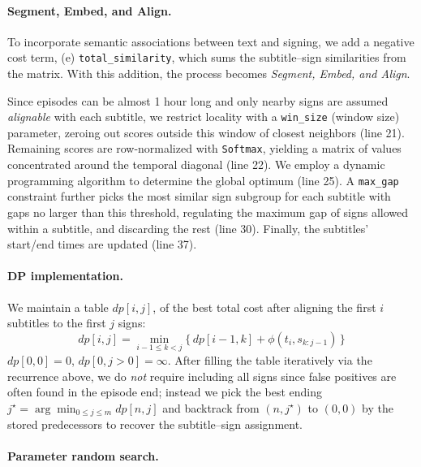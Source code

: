 \documentclass[11pt]{article}
\begin{document}
\paragraph{Segment, Embed, and Align.}
To incorporate semantic associations between text and signing, we add a negative cost term, (e) \texttt{total\_similarity}, which sums the subtitle–sign similarities from the matrix. 
With this addition, the process becomes \textit{Segment, Embed, and Align}. 

Since episodes can be almost 1 hour long and only nearby signs are assumed \textit{alignable} with each subtitle, we restrict locality with a \texttt{win\_size} (window size) parameter, zeroing out scores outside this window of closest neighbors (line 21). 
Remaining scores are row-normalized with \texttt{Softmax}, yielding a matrix of values concentrated around the temporal diagonal (line 22).
We employ a dynamic programming algorithm to determine the global optimum (line 25). 
A \texttt{max\_gap} constraint further picks the most similar sign subgroup for each subtitle with gaps no larger than this threshold, regulating the maximum gap of signs allowed within a subtitle, and discarding the rest (line 30).
Finally, the subtitles' start/end times are updated (line 37).

\paragraph{DP implementation.}
We maintain a table \(dp[i,j]\), of the best total cost after aligning the first \(i\) subtitles to the first \(j\) signs:
\[
\textstyle dp[i,j]=\min_{i-1\le k<j}\{\,dp[i-1,k]+\phi(t_i,s_{k{:}j-1})\,\}
\]
\(dp[0,0]=0\), \(dp[0,j>0]=\infty\).
After filling the table iteratively via the recurrence above, we do \emph{not} require including all signs since false positives are often found in the episode end; instead we pick the best ending \(j^\star=\arg\min_{0\le j\le m} dp[n,j]\) and backtrack from \((n,j^\star)\) to \((0,0)\) by the stored predecessors to recover the subtitle–sign assignment.

\paragraph{Parameter random search.}
\end{document}
